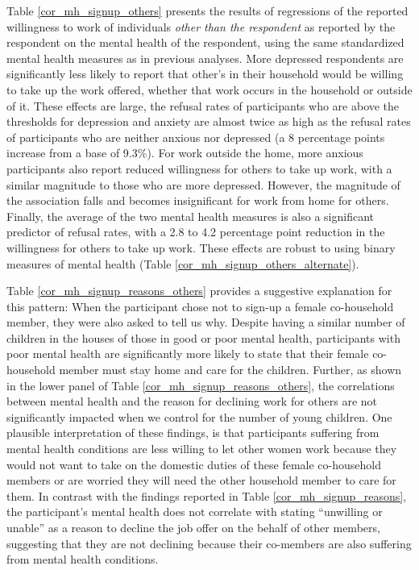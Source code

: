 \documentclass[12pt, a4paper, american]{article}
\begin{document}
Table \ref{cor_mh_signup_others} presents the results of regressions of the reported willingness to work of individuals \textit{other than the respondent} as reported by the respondent on the mental health of the respondent, using the same standardized mental health measures as in previous analyses. More depressed respondents are significantly less likely to report that other's in their household would be willing to take up the work offered, whether that work occurs in the household or outside of it. These effects are large, the refusal rates of participants who are above the thresholds for depression and anxiety  are almost twice as high as the refusal rates of participants who are neither anxious nor depressed (a 8 percentage points increase from a base of 9.3\%). For work outside the home, more anxious participants also report reduced willingness for others to take up work, with a similar magnitude to those who are more depressed. However, the magnitude of the association falls and becomes insignificant for work from home for others. Finally, the average of the two mental health measures is also a significant predictor of refusal rates, with a 2.8 to 4.2 percentage point reduction in the willingness for others to take up work. These effects are robust to using binary measures of mental health (Table \ref{cor_mh_signup_others_alternate}). 

Table \ref{cor_mh_signup_reasons_others} provides a suggestive explanation for this pattern: When the participant chose not to sign-up a female co-household member, they were also asked to tell us why. Despite having a similar number of children in the houses of those in good or poor mental health, participants with poor mental health are significantly more likely to state that their female co-household member must stay home and care for the children. Further, as shown in the lower panel of Table  \ref{cor_mh_signup_reasons_others}, the correlations between mental health and the reason for declining work for others are not significantly impacted when we control for the number of young children. One plausible interpretation of these findings, is that participants suffering from mental health conditions are less willing to let other women work because they would not want to take on the domestic duties of these female co-household members or are worried they will need the other household member to care for them. In contrast with the findings reported in Table \ref{cor_mh_signup_reasons}, the participant's mental health does not correlate with stating ``unwilling or unable'' as a reason to decline the job offer on the behalf of other members, suggesting that they are not declining because their co-members are also suffering from mental health conditions. 
\end{document}
